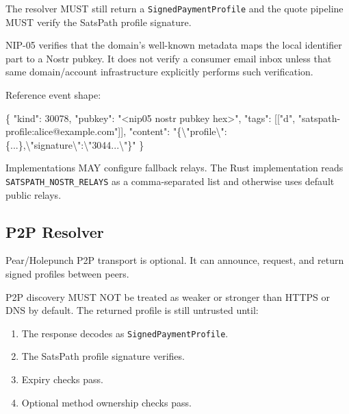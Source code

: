 \documentclass[
]{article}
\newenvironment{Shaded}{}{}
\newcommand{\CharTok}[1]{\textcolor[rgb]{0.25,0.44,0.63}{#1}}
\newcommand{\DataTypeTok}[1]{\textcolor[rgb]{0.56,0.13,0.00}{#1}}
\newcommand{\DecValTok}[1]{\textcolor[rgb]{0.25,0.63,0.44}{#1}}
\newcommand{\FunctionTok}[1]{\textcolor[rgb]{0.02,0.16,0.49}{#1}}
\newcommand{\OtherTok}[1]{\textcolor[rgb]{0.00,0.44,0.13}{#1}}
\newcommand{\StringTok}[1]{\textcolor[rgb]{0.25,0.44,0.63}{#1}}
\providecommand{\tightlist}{%
  \setlength{\itemsep}{0pt}\setlength{\parskip}{0pt}}
\begin{document}
The resolver MUST still return a \texttt{SignedPaymentProfile} and the
quote pipeline MUST verify the SatsPath profile signature.

NIP-05 verifies that the domain's well-known metadata maps the local
identifier part to a Nostr pubkey. It does not verify a consumer email
inbox unless that same domain/account infrastructure explicitly performs
such verification.

Reference event shape:

\begin{Shaded}
\begin{Highlighting}[]
\FunctionTok{\{}
  \DataTypeTok{"kind"}\FunctionTok{:} \DecValTok{30078}\FunctionTok{,}
  \DataTypeTok{"pubkey"}\FunctionTok{:} \StringTok{"\textless{}nip05 nostr pubkey hex\textgreater{}"}\FunctionTok{,}
  \DataTypeTok{"tags"}\FunctionTok{:} \OtherTok{[[}\StringTok{"d"}\OtherTok{,} \StringTok{"satspath{-}profile:alice@example.com"}\OtherTok{]]}\FunctionTok{,}
  \DataTypeTok{"content"}\FunctionTok{:} \StringTok{"\{}\CharTok{\textbackslash{}"}\StringTok{profile}\CharTok{\textbackslash{}"}\StringTok{:\{...\},}\CharTok{\textbackslash{}"}\StringTok{signature}\CharTok{\textbackslash{}"}\StringTok{:}\CharTok{\textbackslash{}"}\StringTok{3044...}\CharTok{\textbackslash{}"}\StringTok{\}"}
\FunctionTok{\}}
\end{Highlighting}
\end{Shaded}

Implementations MAY configure fallback relays. The Rust implementation
reads \texttt{SATSPATH\_NOSTR\_RELAYS} as a comma-separated list and
otherwise uses default public relays.

\hypertarget{p2p-resolver}{%
\subsection{P2P Resolver}\label{p2p-resolver}}

Pear/Holepunch P2P transport is optional. It can announce, request, and
return signed profiles between peers.

P2P discovery MUST NOT be treated as weaker or stronger than HTTPS or
DNS by default. The returned profile is still untrusted until:

\begin{enumerate}
\def\labelenumi{\arabic{enumi}.}
\tightlist
\item
  The response decodes as \texttt{SignedPaymentProfile}.
\item
  The SatsPath profile signature verifies.
\item
  Expiry checks pass.
\item
  Optional method ownership checks pass.
\end{enumerate}
\end{document}

